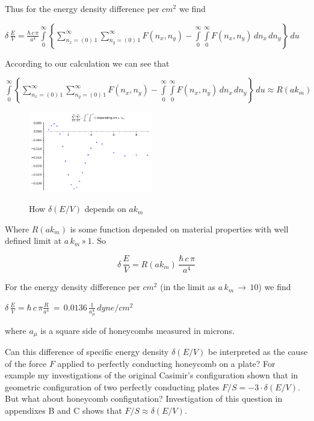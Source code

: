 \documentclass[11pt]{article}
\begin{document}
    Thus for the energy density difference per \(cm^2\) we find

    \(\delta\,\frac{E}{V} = \frac{\hbar\,c\,\pi}{a^4} \int\limits_{0}^{\infty}{ \left\{ \sum\limits_{n_x=\left(0\right)\,1}^{\infty} \sum\limits_{n_y=\left(0\right)\,1}^{\infty} F\left(n_x, n_y\right) - \int\limits_{0}^{\infty} \int\limits_{0}^{\infty} F\left(n_x, n_y\right)\,d{n_x}\,d{n_y} \right\} }\,d{u}\)

    According to our calculation we can see that

    \(\int\limits_{0}^{\infty}{ \left\{ \sum\limits_{n_x=\left(0\right)\,1}^{\infty} \sum\limits_{n_y=\left(0\right)\,1}^{\infty} F\left(n_x, n_y\right) - \int\limits_{0}^{\infty} \int\limits_{0}^{\infty} F\left(n_x, n_y\right)\,d{n_x}\,d{n_y} \right\} }\,d{u} \approx R\left(a k_m\right)\)

    \begin{figure}
\begin{center}
\includegraphics[width=0.48\textwidth]{sum_sum_int_int_G_on_a_km.png}
\caption{}{How $\delta\left(E/V\right)$ depends on $a k_m$}
\end{center}
\label{fig:G_on_a_km}
\end{figure}

    Where \(R\left(a k_m\right)\) is some function depended on material
properties with well defined limit at \(a\,k_m\,»\,1\). So

    \begin{equation}
\delta\,\frac{E}{V} = R\left(a k_m\right)\,\frac{\hbar\,c\,\pi}{a^4}
\end{equation}

    For the energy density difference per \(cm^2\) (in the limit as
\(a\,k_m\,\rightarrow \,10\)) we find

    \(\delta\,\frac{E}{V} = \hbar\,c\, \pi\frac{R}{a^4}\,=\,0.0136\,\frac{1}{a_{\mu}^4}\,dyne/cm^2\)

    where \(a_{\mu}\) is a square side of honeycombs measured in microns.

    Can this difference of specific energy density
\(\delta\left(E/V\right)\) be interpreted as the cause of the force
\(F\) applied to perfectly conducting honeycomb on a plate? For example
my investigations of the original Casimir's configuration shown that in
geometric configuration of two perfectly conducting plates
\(F/S = -3 \cdot \delta\left(E/V\right)\). But what about honeycomb
configutation? Investigation of this question in appendixes B and C
shows that \(F/S \approx \delta\left(E/V\right)\).
\end{document}
